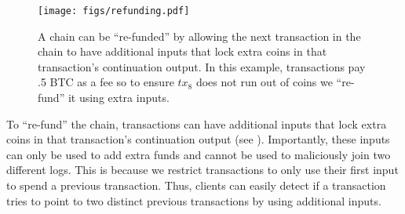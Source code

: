 \begin{figure}[t]
	\centering
	\texttt{[image: figs/refunding.pdf]}
	\vspace{-3.1cm}
	\caption{A \Sys chain can be ``re-funded'' by allowing the next transaction in the chain to have additional inputs that lock extra coins in that transaction's continuation output. In this example, \Sys transactions pay .5 BTC as a fee so to ensure $tx_8$ does not run out of coins we ``re-fund'' it using extra inputs.}
	\label{fig:refunding}
\end{figure}

To ``re-fund'' the chain, \Sys transactions can have additional inputs that lock extra coins in that transaction's continuation output (see ).
Importantly, these inputs can only be used to add extra funds and cannot be used to maliciously join two different logs.
This is because we restrict \Sys transactions to only use their first input to spend a previous \Sys transaction.
Thus, clients can easily detect if a \Sys transaction tries to point to two distinct previous \Sys transactions by using additional inputs.